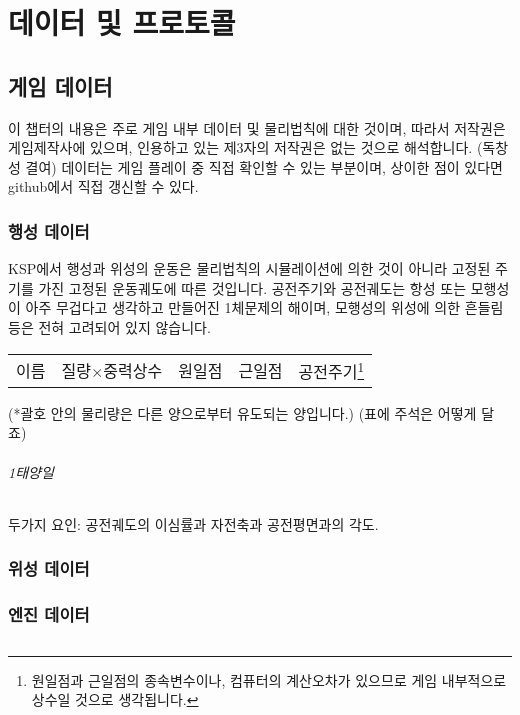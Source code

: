 \part{데이터 및 프로토콜}
\chapter{게임 데이터}
이 챕터의 내용은 주로 게임 내부 데이터 및 물리법칙에 대한 것이며, 
따라서 저작권은 게임제작사에 있으며, 인용하고 있는 제3자의 저작권은 없는 것으로 해석합니다. (독창성 결여)
데이터는 게임 플레이 중 직접 확인할 수 있는 부분이며, 상이한 점이 있다면 github에서 직접 갱신할 수 있다.

\section{행성 데이터}
KSP에서 행성과 위성의 운동은 물리법칙의 시뮬레이션에 의한 것이 아니라 고정된 주기를 가진 고정된 운동궤도에 따른 것입니다. 공전주기와 공전궤도는 항성 또는 모행성이 아주 무겁다고 생각하고 만들어진 1체문제의 해이며, 모행성의 위성에 의한 흔들림 등은 전혀 고려되어 있지 않습니다.
\begin{tabular}{|l|r|r|r|r|}
\hline
이름&질량$\times$중력상수&원일점&근일점&공전주기\footnote{원일점과 근일점의 종속변수이나, 컴퓨터의 계산오차가 있으므로 게임 내부적으로 상수일 것으로 생각됩니다.}
\end{tabular}
(*괄호 안의 물리량은 다른 양으로부터 유도되는 양입니다.)
(표에 주석은 어떻게 달죠)
\paragraph{1태양일}
두가지 요인: 공전궤도의 이심률과 자전축과 공전평면과의 각도.

\section{위성 데이터}
\section{엔진 데이터}

\chapter{}